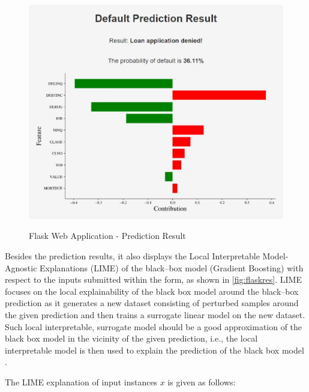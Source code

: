        \begin{figure}[H]
            \centering
            \caption{Flask Web Application - Prediction Result}\vspace{0.5em}
            \label{fig:flaskres}\
            \includegraphics[width=130mm]{Figures/flask_app_result.jpg}
        
            \vspace{-1em}
        \end{figure}
        
        Besides the prediction results, it also displays the Local Interpretable Model-Agnostic Explanations (LIME) of the black--box model (Gradient Boosting) with respect to the inputs submitted within the form, as shown in \autoref{fig:flaskres}.
        LIME focuses on the local explainability of the black box model around the black--box prediction as it generates a new dataset consisting of perturbed samples around the given prediction and then trains a surrogate linear model on the new dataset.
        Such local interpretable, surrogate model should be a good approximation of the black box model in the vicinity of the given prediction, i.e., the local interpretable model is then used to explain the prediction of the black box model \citep{ribeiro2016should}.
        
        The LIME explanation of input instances $x$ is given as follows:
        
